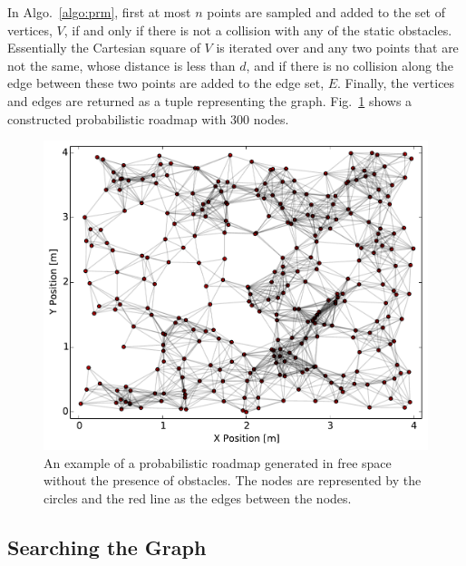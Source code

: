 
In Algo.~\ref{algo:prm}, first at most $n$ points are sampled and added to the
set of vertices, $V$, if and only if there is not a collision with any of the
static obstacles. Essentially the Cartesian square of $V$ is iterated over and
any two points that are not the same, whose distance is less than $d$, and if
there is no collision along the edge between these two points are added to the
edge set, $E$. Finally, the vertices and edges are returned as a tuple
representing the graph. Fig.~\ref{fig:prm} shows a constructed probabilistic
roadmap with 300 nodes.

\begin{figure}[h!]
    \centering
    \includegraphics[width=0.8\linewidth]{figs/roadmap}

    \caption{An example of a probabilistic roadmap generated in free space
    without the presence of obstacles. The nodes are represented by the circles
and the red line as the edges between the nodes.}

    \label{fig:prm}
\end{figure}

\subsection{Searching the Graph}

